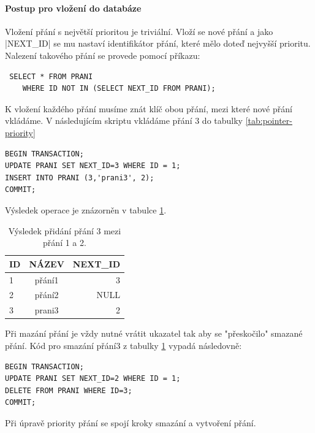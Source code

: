 \paragraph{Postup pro vložení do databáze}
Vložení přání s největší prioritou je triviální. Vloží se nové přání a jako |NEXT_ID| se mu nastaví identifikátor přání, které mělo doteď nejvyšší prioritu. Nalezení takového přání se provede pomocí příkazu:

\begin{lstlisting}
 SELECT * FROM PRANI
    WHERE ID NOT IN (SELECT NEXT_ID FROM PRANI);
\end{lstlisting}

K vložení každého přání musíme znát klíč obou přání, mezi které nové přání vkládáme. V následujícím skriptu vkládáme přání 3 do tabulky \ref{tab:pointer-priority}

\begin{lstlisting}
BEGIN TRANSACTION;
UPDATE PRANI SET NEXT_ID=3 WHERE ID = 1;
INSERT INTO PRANI (3,'prani3', 2);
COMMIT;
\end{lstlisting}

Výsledek operace je znázorněn v tabulce \ref{tab:pointer-priority-result}.

\begin{table}[htb]
	\begin{center}
	  \begin{tabular}{ | l | c | r | }
	    \hline
	    ID & NÁZEV & NEXT\_ID  \\ \hline \hline
	    1 & přání1 & 3  \\ \hline
	    2 & přání2 & NULL \\ \hline
	    3 & prani3 & 2 \\ \hline
	  \end{tabular}
	  \caption{Výsledek přidání přání 3 mezi přání 1 a 2.}
	  \label{tab:pointer-priority-result}
	\end{center}
\end{table}

Při mazání přání je vždy nutné vrátit ukazatel tak aby se "přeskočilo" smazané přání. Kód pro smazání přání3 z tabulky \ref{tab:pointer-priority-result} vypadá následovně:

\begin{lstlisting}
BEGIN TRANSACTION;
UPDATE PRANI SET NEXT_ID=2 WHERE ID = 1;
DELETE FROM PRANI WHERE ID=3;
COMMIT;
\end{lstlisting}

Při úpravě priority přání se spojí kroky smazání a vytvoření přání.


